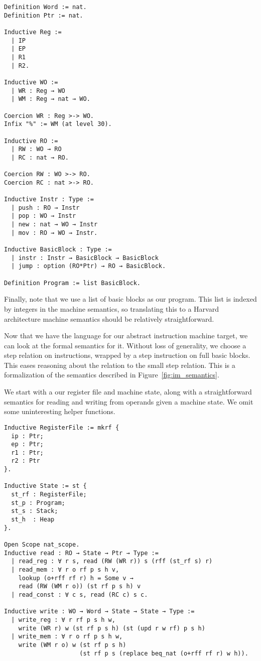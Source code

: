 \begin{verbatim}
Definition Word := nat.
Definition Ptr := nat.

Inductive Reg := 
  | IP
  | EP
  | R1
  | R2.

Inductive WO := 
  | WR : Reg → WO
  | WM : Reg → nat → WO.

Coercion WR : Reg >-> WO.
Infix "%" := WM (at level 30).

Inductive RO := 
  | RW : WO → RO
  | RC : nat → RO.

Coercion RW : WO >-> RO.
Coercion RC : nat >-> RO.

Inductive Instr : Type :=
  | push : RO → Instr
  | pop : WO → Instr
  | new : nat → WO → Instr 
  | mov : RO → WO → Instr.

Inductive BasicBlock : Type :=
  | instr : Instr → BasicBlock → BasicBlock
  | jump : option (RO*Ptr) → RO → BasicBlock.

Definition Program := list BasicBlock.
\end{verbatim}

Finally, note that we use a list of basic blocks as our program. This list is
indexed by integers in the machine semantics, so translating this to a Harvard 
architecture machine semantics should be relatively straightforward. 

Now that we have the language for our abstract instruction machine target, we
can look at the formal semantics for it. Without loss of generality, we choose a
step relation on instructions, wrapped by a step instruction on full basic
blocks. This eases reasoning about the relation to the small step \ce
relation. This is a formalization of the semantics described in
Figure~\ref{fig:im_semantics}. 

We start with a our register file and machine state, along with a
straightforward semantics for reading and writing from operands given a 
machine state. We omit some uninteresting helper functions. 

\begin{verbatim}
Inductive RegisterFile := mkrf {
  ip : Ptr;
  ep : Ptr;
  r1 : Ptr; 
  r2 : Ptr
}. 

Inductive State := st {
  st_rf : RegisterFile;
  st_p : Program;
  st_s : Stack;
  st_h  : Heap
}.

Open Scope nat_scope. 
Inductive read : RO → State → Ptr → Type :=
  | read_reg : ∀ r s, read (RW (WR r)) s (rff (st_rf s) r)
  | read_mem : ∀ r o rf p s h v, 
    lookup (o+rff rf r) h = Some v →
    read (RW (WM r o)) (st rf p s h) v
  | read_const : ∀ c s, read (RC c) s c.

Inductive write : WO → Word → State → State → Type :=
  | write_reg : ∀ r rf p s h w, 
    write (WR r) w (st rf p s h) (st (upd r w rf) p s h)
  | write_mem : ∀ r o rf p s h w, 
    write (WM r o) w (st rf p s h) 
                     (st rf p s (replace beq_nat (o+rff rf r) w h)).
\end{verbatim}

